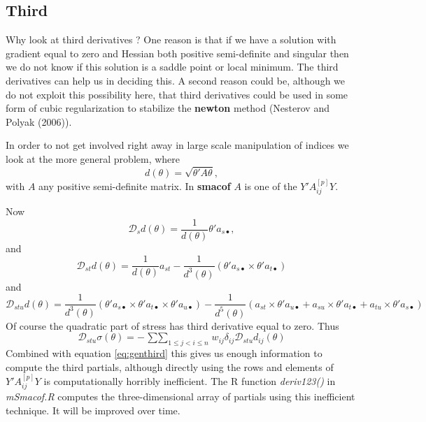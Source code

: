 \documentclass[
  12pt,
]{article}
\newcommand{\jis}{\mathop{\sum\sum}_{1\leq j<i\leq n}}
\begin{document}
\subsection{Third}\label{third}

Why look at third derivatives ? One reason is that if we have a solution with
gradient equal to zero and Hessian both positive semi-definite and singular then
we do not know if this solution is a saddle point or local minimum. The
third derivatives can help us in deciding this. A second reason could be,
although we do not exploit this possibility here, that third derivatives
could be used in some form of cubic regularization to stabilize the \textbf{newton}
method (Nesterov and Polyak (2006)).

In order to not get involved right away in large scale manipulation of indices
we look at the more general problem, where
\begin{equation}
d(\theta)=\sqrt{\theta'A\theta},
\label{eq:gendis}
\end{equation}
with \(A\) any positive semi-definite matrix. In \textbf{smacof} \(A\) is one of the \(Y'A_{ij}^{[p]}Y\).

Now
\begin{equation}
\mathcal{D}_sd(\theta)=\frac{1}{d(\theta)}\theta'a_{s\bullet},
\label{eq:genfirst}
\end{equation}
and
\begin{equation}
\mathcal{D}_{st}d(\theta)=\frac{1}{d(\theta)}a_{st}-\frac{1}{d^3(\theta)}(\theta'a_{s\bullet}\times\theta'a_{t\bullet})
\label{eq:gensecond}
\end{equation}
and
\begin{equation}
\mathcal{D}_{stu}d(\theta)=\frac{1}{d^3(\theta)}(\theta'a_{s\bullet}\times\theta'a_{t\bullet}\times \theta'a_{u\bullet})-\frac{1}{d^5(\theta)}
(a_{st}\times\theta'a_{u\bullet}+a_{su}\times\theta'a_{t\bullet}+a_{tu}\times\theta'a_{s\bullet} )
\label{eq:genthird}
\end{equation}
Of course the quadratic part of stress has third derivative equal to zero. Thus
\begin{equation}
\mathcal{D}_{stu}\sigma(\theta)=-\jis w_{ij}\delta_{ij}\mathcal{D}_{stu}d_{ij}(\theta)
\label{eq:gencombined}
\end{equation}
Combined with equation \eqref{eq:genthird} this gives us enough information to compute the third partials, although directly using the rows and elements of \(Y'A_{ij}^{[p]}Y\) is computationally horribly inefficient. The
R function \emph{deriv123()} in \emph{mSmacof.R} computes the three-dimensional array of partials using this inefficient technique. It will be improved over time.
\end{document}
